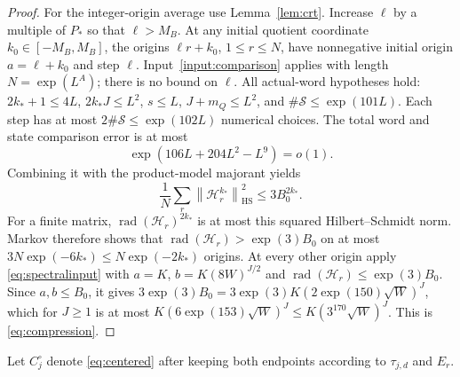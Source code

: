\documentclass[11pt]{article}
\theoremstyle{definition}
\newcommand{\norm}[1]{\left\lVert#1\right\rVert}
\DeclareMathOperator{\rad}{rad}
\DeclareMathOperator{\HS}{HS}
\begin{document}
\begin{proof}
For the integer-origin average use Lemma~\ref{lem:crt}.
Increase $\ell$ by a multiple of $P_*$ so that $\ell>M_B$.
At any initial quotient coordinate $k_0\in[-M_B,M_B]$, the origins
$\ell r+k_0$, $1\le r\le N$, have nonnegative initial origin
$a=\ell+k_0$ and step $\ell$.
Input~\ref{input:comparison} applies with length $N=\exp(L^A)$;
there is no bound on $\ell$.
All actual-word hypotheses hold: $2k_*+1\le4L$, $2k_*J\le L^2$,
$s\le L$, $J+m_Q\le L^2$, and $\#\mathcal S\le\exp(101L)$.
Each step has at most $2\#\mathcal S\le\exp(102L)$ numerical choices.
The total word and state comparison error is at most
\[
 \exp(106L+204L^2-L^9)=o(1).
\]
Combining it with the product-model majorant yields
\[
 \frac1N\sum_r\norm{\mathcal H_r^{k_*}}_{\HS}^2
 \le3B_0^{2k_*}.
\]
For a finite matrix, $\rad(\mathcal H_r)^{2k_*}$ is at most this
squared Hilbert--Schmidt norm. Markov therefore shows that
$\rad(\mathcal H_r)>\exp(3)B_0$ on at most
$3N\exp(-6k_*)\le N\exp(-2k_*)$ origins.
At every other origin apply \eqref{eq:spectralinput} with $a=K$,
$b=K(8W)^{J/2}$ and $\rad(\mathcal H_r)\le\exp(3)B_0$.
Since $a,b\le B_0$, it gives
$3\exp(3)B_0=3\exp(3)K(2\exp(150)\sqrt W)^J$, which for $J\ge1$
is at most $K(6\exp(153)\sqrt W)^J\le K(3^{170}\sqrt W)^J$.
This is \eqref{eq:compression}.
\end{proof}

Let $C_j^\circ$ denote \eqref{eq:centered} after keeping both endpoints
according to $\tau_{j,d}$ and $E_r$.
\end{document}
